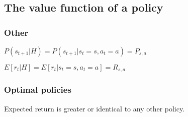 
\subsection{The value function of a policy}

\subsubsection{Other}

\(P(s_{t+1}|H)=P(s_{t+1}|s_t=s, a_t=a)=P_{s,a}\)

\(E[r_t|H]=E[r_t|s_t=s, a_t=a]=R_{s,a}\)

\subsubsection{Optimal policies}

Expected return is greater or identical to any other policy.

